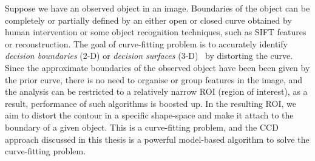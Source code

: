 Suppose we have an observed object in an
image. Boundaries of the object can be completely or partially defined
by an either open or closed curve obtained by human intervention or
some object recognition techniques, such as SIFT features or reconstruction. The goal of
curve-fitting problem is to accurately identify \textit{decision boundaries} (2-D) or
\textit{decision surfaces} (3-D)~\cite{bishop2006pattern} by
distorting the curve. Since the approximate boundaries of the observed
object have been been given by the prior curve, there is no need to organise or group features in the
image, and the analysis can be restricted to a relatively narrow
ROI (region of interest), as a result, performance of such algorithms
is boosted up. In the resulting ROI, we aim to distort the contour in a specific
shape-space and make it attach to the boundary of a given object. This
is a curve-fitting problem, and the CCD approach discussed in this
thesis is a powerful model-based algorithm to solve the curve-fitting
problem.

